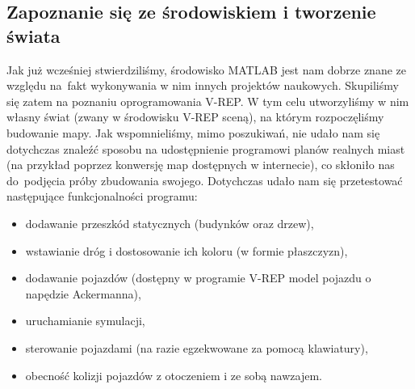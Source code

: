 \documentclass[11pt, a4paper, twoside]{article}
\begin{document}
	\subsection{Zapoznanie się ze środowiskiem i tworzenie świata}
	\label{subsec:scena}
	Jak już wcześniej stwierdziliśmy, środowisko MATLAB jest nam dobrze znane ze względu na~fakt wykonywania w nim innych projektów naukowych. Skupiliśmy się zatem na poznaniu oprogramowania V-REP. W tym celu utworzyliśmy w nim własny świat (zwany w środowisku \mbox{V-REP} sceną), na którym rozpoczęliśmy budowanie mapy. Jak wspomnieliśmy, mimo poszukiwań, nie udało nam się dotychczas znaleźć sposobu na udostępnienie programowi planów realnych miast (na przykład poprzez konwersję map dostępnych w internecie), co skłoniło nas do~podjęcia próby zbudowania swojego. Dotychczas udało nam się przetestować następujące funkcjonalności programu:
	\begin{itemize}
		\item dodawanie przeszkód statycznych (budynków oraz drzew),
		\item wstawianie dróg i dostosowanie ich koloru (w formie płaszczyzn),
		\item dodawanie pojazdów (dostępny w programie V-REP model pojazdu o napędzie Ackermanna),
		\item uruchamianie symulacji,
		\item sterowanie pojazdami (na razie egzekwowane za pomocą klawiatury),
		\item obecność kolizji pojazdów z otoczeniem i ze sobą nawzajem.
	\end{itemize}
	
\end{document}
